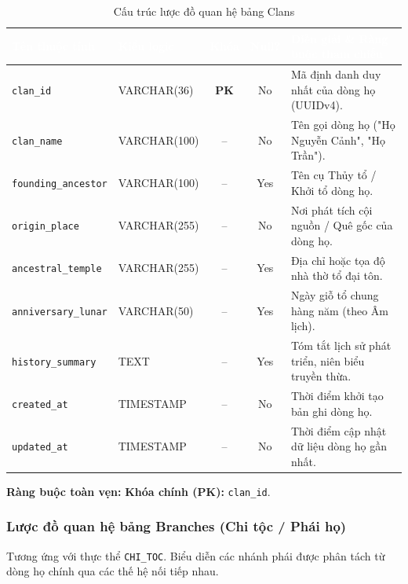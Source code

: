 \begin{table}[H]
    \centering
    \small
    \renewcommand{\arraystretch}{1.2}
    \begin{tabularx}{\textwidth}{p{3.4cm} p{2.6cm} c c X}
        \toprule
        \rowcolor{tableheader}\textcolor{white}{\textbf{Tên thuộc tính}} & \textcolor{white}{\textbf{Kiểu logic}} & \textcolor{white}{\textbf{Khóa}} & \textcolor{white}{\textbf{Null?}} & \textcolor{white}{\textbf{Diễn giải \& Ràng buộc tham chiếu}} \\
        \midrule
        \rowcolor{tablerowalt}
        \texttt{clan\_id} & VARCHAR(36) & \textcolor{pkcolor}{\textbf{PK}} & No & Mã định danh duy nhất của dòng họ (UUIDv4). \\
        \texttt{clan\_name} & VARCHAR(100) & -- & No & Tên gọi dòng họ ("Họ Nguyễn Cảnh", "Họ Trần"). \\
        \rowcolor{tablerowalt}
        \texttt{founding\_ancestor} & VARCHAR(100) & -- & Yes & Tên cụ Thủy tổ / Khởi tổ dòng họ. \\
        \texttt{origin\_place} & VARCHAR(255) & -- & No & Nơi phát tích cội nguồn / Quê gốc của dòng họ. \\
        \rowcolor{tablerowalt}
        \texttt{ancestral\_temple} & VARCHAR(255) & -- & Yes & Địa chỉ hoặc tọa độ nhà thờ tổ đại tôn. \\
        \texttt{anniversary\_lunar} & VARCHAR(50) & -- & Yes & Ngày giỗ tổ chung hàng năm (theo Âm lịch). \\
        \rowcolor{tablerowalt}
        \texttt{history\_summary} & TEXT & -- & Yes & Tóm tắt lịch sử phát triển, niên biểu truyền thừa. \\
        \texttt{created\_at} & TIMESTAMP & -- & No & Thời điểm khởi tạo bản ghi dòng họ. \\
        \rowcolor{tablerowalt}
        \texttt{updated\_at} & TIMESTAMP & -- & No & Thời điểm cập nhật dữ liệu dòng họ gần nhất. \\
        \bottomrule
    \end{tabularx}
    \caption{Cấu trúc lược đồ quan hệ bảng Clans}
    \label{tab:schema_clans}
\end{table}

\noindent\textbf{Ràng buộc toàn vẹn:} \textbf{Khóa chính (PK):} \texttt{clan\_id}.

\subsubsection{Lược đồ quan hệ bảng Branches (Chi tộc / Phái họ)}
Tương ứng với thực thể \texttt{CHI\_TOC}. Biểu diễn các nhánh phái được phân tách từ dòng họ chính qua các thế hệ nối tiếp nhau.

